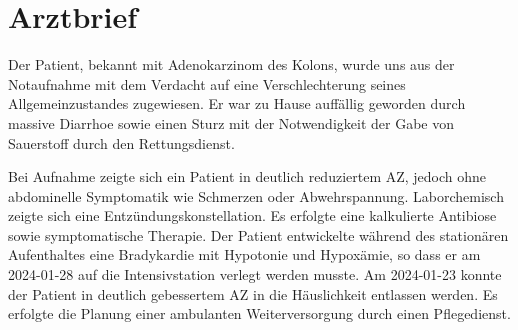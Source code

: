 \documentclass{article}%
\begin{document}
%
\normalsize%
\section{Arztbrief}%
\label{sec:Arztbrief}%
Der Patient, bekannt mit Adenokarzinom des Kolons, wurde uns aus der Notaufnahme mit dem Verdacht auf eine Verschlechterung seines Allgemeinzustandes zugewiesen. Er war zu Hause auffällig geworden durch massive Diarrhoe sowie einen Sturz mit der Notwendigkeit der Gabe von Sauerstoff durch den Rettungsdienst.
\newline%

\newline%
Bei Aufnahme zeigte sich ein Patient in deutlich reduziertem AZ, jedoch ohne abdominelle Symptomatik wie Schmerzen oder Abwehrspannung. Laborchemisch zeigte sich eine Entzündungskonstellation. Es erfolgte eine kalkulierte Antibiose sowie symptomatische Therapie. Der Patient entwickelte während des stationären Aufenthaltes eine Bradykardie mit Hypotonie und Hypoxämie, so dass er am 2024{-}01{-}28 auf die Intensivstation verlegt werden musste. Am 2024{-}01{-}23 konnte der Patient in deutlich gebessertem AZ in die Häuslichkeit entlassen werden. Es erfolgte die Planung einer ambulanten Weiterversorgung durch einen Pflegedienst. 
\newline%

%
\end{document}
